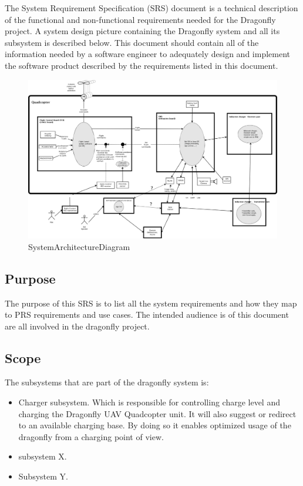\documentclass[a4paper]{article}
\begin{document}
The System Requirement Specification (SRS) document is a technical description of the functional and non-functional requirements needed for the Dragonfly project. A system design picture containing the Dragonfly system and all its subsystem is described below. This document should contain all of the information needed by a software engineer to adequately design and implement the software product described by the requirements listed in this document. 

\begin{figure}[!h]
	\centering
	\includegraphics[width=\textwidth]{images/SystemArchitectureDiagram_DF.png}
	\caption{SystemArchitectureDiagram}
	\label{fig:sysarchdiag}
\end{figure}

\subsection{Purpose}

The purpose of this SRS is to list all the system requirements and how they map to PRS requirements and use cases. The intended audience is of this document are all involved in the dragonfly project.

\subsection{Scope}

The subsystems that are part of the dragonfly system is:
\begin{itemize}
	\item Charger subsystem. Which is responsible for controlling charge level and charging the Dragonfly UAV Quadcopter unit. It will also suggest or redirect to an available charging base. 
	By doing so it enables optimized usage of the dragonfly from a charging point of view.
	\item subsystem X.
	\item Subsystem Y.
\end{itemize}
\end{document}

